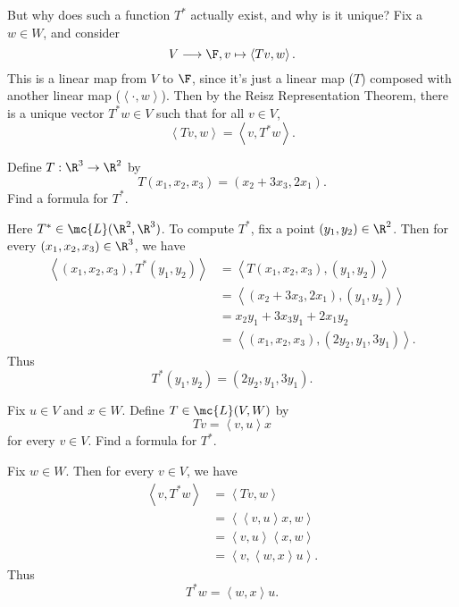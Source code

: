 \documentclass[math0540-lecture-notes.tex]{subfiles}
\begin{document}
But why does such a function $T^*$ actually exist, and why is it unique? Fix a $w\in W$, and
consider \[
  V\longrightarrow \F, v\mapsto \left<Tv,w \right> 
.\] This is a linear map from $V$ to $\F$, since it's just a linear map ($T$) composed with another
linear map ($\left<\cdot ,w \right> $). Then by the Reisz Representation Theorem, there is a unique
vector $T^*w\in V$ such that for all $v\in V$, \[
  \left<Tv,w \right> =\left<v,T^*w \right> 
.\] 

\begin{example}
  Define $T:\R^3\to \R^2$ by \[
    T(x_1,x_2,x_3)=(x_2+3x_3,2x_1)
  .\] Find a formula for $T^*$.
\end{example}
\begin{solution}
  Here $T^*\in \mc{L}(\R^2,\R^3)$. To compute $T^*$, fix a point $(y_1,y_2)\in \R^2$. Then for every
  $(x_1,x_2,x_3)\in \R^3$, we have
  \begin{align*}
    \left<(x_1,x_2,x_3),T^*(y_1,y_2) \right> &= \left<T(x_1,x_2,x_3),(y_1,y_2) \right>  \\ 
                                             &= \left<(x_2+3x_3,2x_1),(y_1,y_2) \right>  \\
                                             &= x_2y_1+3x_3y_1+2x_1y_2 \\
                                             &= \left<(x_1,x_2,x_3),(2y_2,y_1,3y_1) \right>
  .\end{align*} Thus \[
  T^*(y_1,y_2)=(2y_2,y_1,3y_1)
  .\] 
\end{solution}
\begin{example}
  Fix $u\in V$ and $x\in W$. Define $T\in \mc{L}(V,W)$ by \[
    Tv=\left<v,u \right> x
  \] for every $v\in V$. Find a formula for $T^*$.
\end{example}
\begin{solution}
  Fix $w\in W$. Then for every $v\in V$, we have
  \begin{align*}
    \left<v,T^*w \right> &= \left<Tv,w \right>  \\
    &= \left<\left<v,u \right> x,w \right>  \\
    &= \left<v,u \right> \left<x,w \right>  \\
    &= \left<v,\left<w,x \right> u \right> 
  .\end{align*} Thus \[
    T^*w=\left<w,x \right> u
  .\] 
\end{solution}
\end{document}
